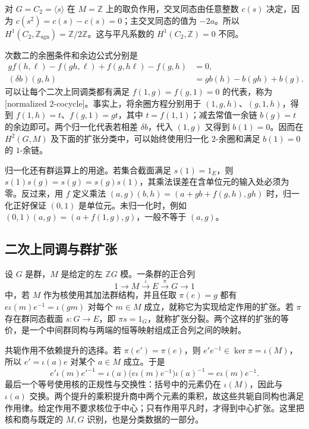 \ProseParagraphBreak
对 \(G=C_2=\langle s\rangle\) 在 \(M=\mathbb Z\) 上的取负作用，交叉同态由任意整数 \(c(s)\) 决定，因为 \(c(s^2)=c(s)-c(s)=0\)；主交叉同态的值为 \(-2a\)。所以 \(H^1(C_2,\mathbb Z_{\mathrm{sgn}})=\mathbb Z/2\mathbb Z\)。这与平凡系数的 \(H^1(C_2,\mathbb Z)=0\) 不同。

\ProseParagraphBreak
次数二的余圈条件和余边公式分别是
\begin{align}
	g f(h,\ell)-f(gh,\ell)+f(g,h\ell)-f(g,h)&=0,
	\label{b4:eq:group-two-cocycle}\\
	(\delta b)(g,h)&=g b(h)-b(gh)+b(g).
	\label{b4:eq:group-two-coboundary}
\end{align}
可以让每个二次上同调类都有满足 \(f(1,g)=f(g,1)=0\) 的代表，称为[normalized 2-cocycle]。事实上，将余圈方程分别用于 \((1,g,h)\)、\((g,1,h)\)，得到 \(f(1,h)=t\)、\(f(g,1)=gt\)，其中 \(t=f(1,1)\)；减去常值一余链 \(b(g)=t\) 的余边即可。两个归一化代表若相差 \(\delta b\)，代入 \((1,g)\) 又得到 \(b(1)=0\)。因而在 \(H^2(G,M)\) 及下面的扩张分类中，可以始终使用归一化 \(2\)-余圈和满足 \(b(1)=0\) 的 \(1\)-余链。

\ProseParagraphBreak
归一化还有群运算上的用途。若集合截面满足 \(s(1)=1_E\)，则 \(s(1)s(g)=s(g)=s(g)s(1)\)，其乘法误差在含单位元的输入处必须为零。反过来，用 \(f\) 定义乘法 \((a,g)(b,h)=(a+gb+f(g,h),gh)\) 时，归一化正好保证 \((0,1)\) 是单位元。未归一化时，例如 \((0,1)(a,g)=(a+f(1,g),g)\)，一般不等于 \((a,g)\)。

\subsection{二次上同调与群扩张}
\label{b4:subsec:1102:02}

\begin{definition}\label{b4:def:extension-fixed-action}
	设 \(G\) 是群，\(M\) 是给定的左 \(\mathbb ZG\) 模。一条群的正合列
	\[
		1\longrightarrow M\xrightarrow{\iota}E\xrightarrow{\pi}G\longrightarrow1
	\]
	中，若 \(M\) 作为核使用其加法群结构，并且任取 \(\pi(e)=g\) 都有 \(e\iota(m)e^{-1}=\iota(gm)\) 对每个 \(m\in M\) 成立，就称它为实现给定作用的扩张。若 \(\pi\) 存在群同态截面 \(s:G\to E\)，即 \(\pi s=1_G\)，就称扩张分裂。两个这样的扩张的等价，是一个中间群同构与两端的恒等映射组成正合列之间的映射。
\end{definition}

共轭作用不依赖提升的选择。若 \(\pi(e')=\pi(e)\)，则 \(e'e^{-1}\in\ker\pi=\iota(M)\)，所以 \(e'=\iota(a)e\) 对某个 \(a\in M\) 成立。于是
\[
	e'\iota(m)e'^{-1} =\iota(a)\bigl(e\iota(m)e^{-1}\bigr)\iota(a)^{-1} =e\iota(m)e^{-1}.
\]
最后一个等号使用核的正规性与交换性：括号中的元素仍在 \(\iota(M)\)，因此与 \(\iota(a)\) 交换。两个提升的乘积提升商中两个元素的乘积，故这些共轭自同构也满足作用律。给定作用不要求核位于中心；只有作用平凡时，才得到中心扩张。这里把核和商与既定的 \(M,G\) 识别，也是分类数据的一部分。

